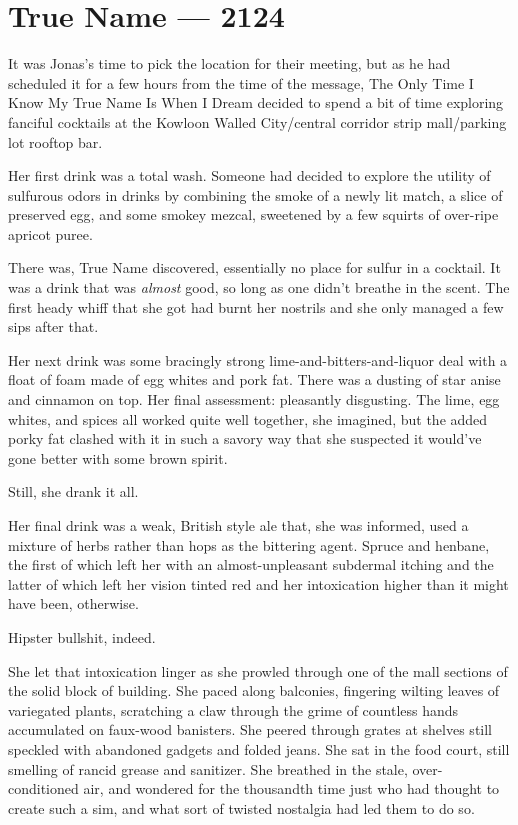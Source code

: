 \hypertarget{true-name-2124}{%
\chapter{True Name — 2124}\label{true-name-2124}}

It was Jonas's time to pick the location for their meeting, but as he had scheduled it for a few hours from the time of the message, The Only Time I Know My True Name Is When I Dream decided to spend a bit of time exploring fanciful cocktails at the Kowloon Walled City/central corridor strip mall/parking lot rooftop bar.

Her first drink was a total wash. Someone had decided to explore the utility of sulfurous odors in drinks by combining the smoke of a newly lit match, a slice of preserved egg, and some smokey mezcal, sweetened by a few squirts of over-ripe apricot puree.

There was, True Name discovered, essentially no place for sulfur in a cocktail. It was a drink that was \emph{almost} good, so long as one didn't breathe in the scent. The first heady whiff that she got had burnt her nostrils and she only managed a few sips after that.

Her next drink was some bracingly strong lime-and-bitters-and-liquor deal with a float of foam made of egg whites and pork fat. There was a dusting of star anise and cinnamon on top. Her final assessment: pleasantly disgusting. The lime, egg whites, and spices all worked quite well together, she imagined, but the added porky fat clashed with it in such a savory way that she suspected it would've gone better with some brown spirit.

Still, she drank it all.

Her final drink was a weak, British style ale that, she was informed, used a mixture of herbs rather than hops as the bittering agent. Spruce and henbane, the first of which left her with an almost-unpleasant subdermal itching and the latter of which left her vision tinted red and her intoxication higher than it might have been, otherwise.

Hipster bullshit, indeed.

She let that intoxication linger as she prowled through one of the mall sections of the solid block of building. She paced along balconies, fingering wilting leaves of variegated plants, scratching a claw through the grime of countless hands accumulated on faux-wood banisters. She peered through grates at shelves still speckled with abandoned gadgets and folded jeans. She sat in the food court, still smelling of rancid grease and sanitizer. She breathed in the stale, over-conditioned air, and wondered for the thousandth time just who had thought to create such a sim, and what sort of twisted nostalgia had led them to do so.

